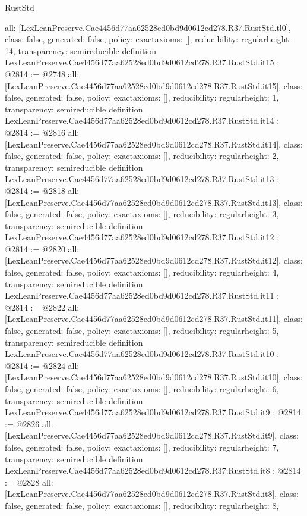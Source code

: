 \begin{lexlean}{RustStd}
\begin{coremodule}
{  all: [LexLeanPreserve.Cae4456d77aa62528ed0bd9d0612cd278.R37.RustStd.tl0],
  class: false,
  generated: false,
  policy: exact{axioms: []},
  reducibility: regular{height: 14},
  transparency: semireducible
}
definition LexLeanPreserve.Cae4456d77aa62528ed0bd9d0612cd278.R37.RustStd.it15 : @2814 := @2748 {
  all: [LexLeanPreserve.Cae4456d77aa62528ed0bd9d0612cd278.R37.RustStd.it15],
  class: false,
  generated: false,
  policy: exact{axioms: []},
  reducibility: regular{height: 1},
  transparency: semireducible
}
definition LexLeanPreserve.Cae4456d77aa62528ed0bd9d0612cd278.R37.RustStd.it14 : @2814 := @2816 {
  all: [LexLeanPreserve.Cae4456d77aa62528ed0bd9d0612cd278.R37.RustStd.it14],
  class: false,
  generated: false,
  policy: exact{axioms: []},
  reducibility: regular{height: 2},
  transparency: semireducible
}
definition LexLeanPreserve.Cae4456d77aa62528ed0bd9d0612cd278.R37.RustStd.it13 : @2814 := @2818 {
  all: [LexLeanPreserve.Cae4456d77aa62528ed0bd9d0612cd278.R37.RustStd.it13],
  class: false,
  generated: false,
  policy: exact{axioms: []},
  reducibility: regular{height: 3},
  transparency: semireducible
}
definition LexLeanPreserve.Cae4456d77aa62528ed0bd9d0612cd278.R37.RustStd.it12 : @2814 := @2820 {
  all: [LexLeanPreserve.Cae4456d77aa62528ed0bd9d0612cd278.R37.RustStd.it12],
  class: false,
  generated: false,
  policy: exact{axioms: []},
  reducibility: regular{height: 4},
  transparency: semireducible
}
definition LexLeanPreserve.Cae4456d77aa62528ed0bd9d0612cd278.R37.RustStd.it11 : @2814 := @2822 {
  all: [LexLeanPreserve.Cae4456d77aa62528ed0bd9d0612cd278.R37.RustStd.it11],
  class: false,
  generated: false,
  policy: exact{axioms: []},
  reducibility: regular{height: 5},
  transparency: semireducible
}
definition LexLeanPreserve.Cae4456d77aa62528ed0bd9d0612cd278.R37.RustStd.it10 : @2814 := @2824 {
  all: [LexLeanPreserve.Cae4456d77aa62528ed0bd9d0612cd278.R37.RustStd.it10],
  class: false,
  generated: false,
  policy: exact{axioms: []},
  reducibility: regular{height: 6},
  transparency: semireducible
}
definition LexLeanPreserve.Cae4456d77aa62528ed0bd9d0612cd278.R37.RustStd.it9 : @2814 := @2826 {
  all: [LexLeanPreserve.Cae4456d77aa62528ed0bd9d0612cd278.R37.RustStd.it9],
  class: false,
  generated: false,
  policy: exact{axioms: []},
  reducibility: regular{height: 7},
  transparency: semireducible
}
definition LexLeanPreserve.Cae4456d77aa62528ed0bd9d0612cd278.R37.RustStd.it8 : @2814 := @2828 {
  all: [LexLeanPreserve.Cae4456d77aa62528ed0bd9d0612cd278.R37.RustStd.it8],
  class: false,
  generated: false,
  policy: exact{axioms: []},
  reducibility: regular{height: 8},
}
\end{coremodule}
\end{lexlean}
